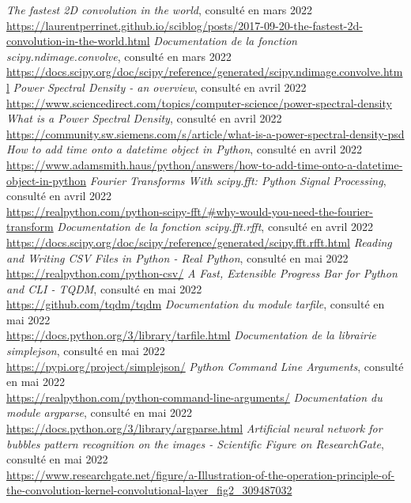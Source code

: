 \documentclass[11pt]{article}
\begin{document}
\begin{thebibliography}{100}
    \textit{The fastest 2D convolution in the world}, consulté en mars 2022\\\url{https://laurentperrinet.github.io/sciblog/posts/2017-09-20-the-fastest-2d-convolution-in-the-world.html}
    \textit{Documentation de la fonction scipy.ndimage.convolve}, consulté en mars 2022\\\url{https://docs.scipy.org/doc/scipy/reference/generated/scipy.ndimage.convolve.html}
    \textit{Power Spectral Density - an overview}, consulté en avril 2022\\\url{https://www.sciencedirect.com/topics/computer-science/power-spectral-density}
    \textit{What is a Power Spectral Density}, consulté en avril 2022\\\url{https://community.sw.siemens.com/s/article/what-is-a-power-spectral-density-psd}
    \textit{How to add time onto a datetime object in Python}, consulté en avril 2022\\\url{https://www.adamsmith.haus/python/answers/how-to-add-time-onto-a-datetime-object-in-python}
    \textit{Fourier Transforms With scipy.fft: Python Signal Processing}, consulté en avril 2022\\\url{https://realpython.com/python-scipy-fft/#why-would-you-need-the-fourier-transform}
    \textit{Documentation de la fonction scipy.fft.rfft}, consulté en avril 2022\\\url{https://docs.scipy.org/doc/scipy/reference/generated/scipy.fft.rfft.html}
    \textit{Reading and Writing CSV Files in Python - Real Python}, consulté en mai 2022\\\url{https://realpython.com/python-csv/}
    \textit{A Fast, Extensible Progress Bar for Python and CLI - TQDM}, consulté en mai 2022\\\url{https://github.com/tqdm/tqdm}
    \textit{Documentation du module tarfile}, consulté en mai 2022\\\url{https://docs.python.org/3/library/tarfile.html}
    \textit{Documentation de la librairie simplejson}, consulté en mai 2022\\\url{https://pypi.org/project/simplejson/}
    \textit{Python Command Line Arguments}, consulté en mai 2022\\\url{https://realpython.com/python-command-line-arguments/}
    \textit{Documentation du module argparse}, consulté en mai 2022\\\url{https://docs.python.org/3/library/argparse.html}
    \textit{Artificial neural network for bubbles pattern recognition on the images - Scientific Figure on ResearchGate}, consulté en mai 2022\\\url{https://www.researchgate.net/figure/a-Illustration-of-the-operation-principle-of-the-convolution-kernel-convolutional-layer_fig2_309487032}
\end{thebibliography}
\end{document}
